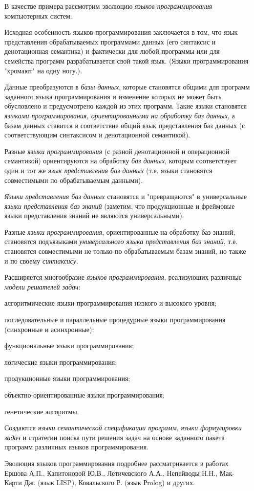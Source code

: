 В качестве примера рассмотрим эволюцию \textit{языков программирования} компьютерных систем:
\begin{textitemize}
	\item Исходная особенность языков программирования заключается в том, что язык представления обрабатываемых программами данных (его синтаксис и денотационная семантика)  и фактически для любой программы или для семейства программ разрабатывается свой такой язык. (Языки программирования "хромают"{} на одну ногу.).
	\item Данные преобразуются в \textit{базы данных}, которые становятся общими для программ заданного языка программирования и изменение которых не может быть обусловлено и предусмотрено каждой из этих программ. Такие языки  становятся \textit{языками программирования, ориентированными на обработку баз данных}, а базам данных ставится в соответствие общий язык представления баз данных (с соответствующим синтаксисом и денотационной семантикой).
	\item Разные \textit{языки программирования} (с разной денотационной и операционной семантикой) ориентируются на обработку \textit{баз данных}, которым соответствует один и тот же \textit{язык представления баз данных} (т.е. языки становятся совместимыми по обрабатываемым данными).
	\item \textit{Языки представления баз данных} становятся  и "превращаются"{} в универсальные \textit{языки представления баз знаний} (заметим, что продукционные и фреймовые языки представления знаний не являются универсальными).
	\item Разные \textit{языки программирования}, ориентированные на обработку баз знаний, становятся подъязыками \textit{универсального языка представления  баз знаний}, т.е. становятся совместимыми не только по обрабатываемым базам знаний, но также и по своему \textit{синтаксису}.
	\item Расширяется многообразие \textit{языков программирования}, реализующих различные \textit{модели решателей задач}:
	\begin{SCn}
		\item алгоритмические языки программирования низкого и высокого уровня;
		\item последовательные и параллельные процедурные языки программирования (синхронные и асинхронные);
		\item функциональные языки программирования;
		\item логические языки программирования;
		\item продукционные языки программирования;
		\item объектно-ориентированные языки программирования;
		\item генетические алгоритмы.
	\end{SCn}
	\item Создаются \textit{языки семантической спецификации программ}, \textit{языки формулировки задач} и стратегии поиска пути решения задач на основе заданного пакета программ различных языков программирования.
\end{textitemize}

Эволюция языков программирования подробнее рассматривается в работах Ершова А.П., Капитоновой Ю.В., Летичевского А.А., Непейводы Н.Н., Мак-Карти Дж. (язык LISP), Ковальского Р. (язык Рrolog) и других.

% 
